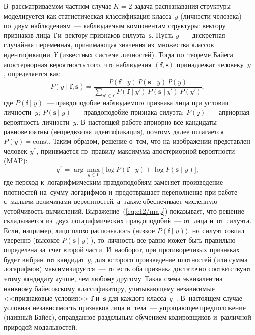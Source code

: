 В~рассматриваемом частном случае $K=2$ задача распознавания структуры
моделируется как статистическая классификация
класса~$y$ (личности человека) по~двум наблюдениям~--- наблюдаемым
компонентам структуры: вектору признаков лица~$\mathbf{f}$
и~вектору признаков силуэта~$\mathbf{s}$. Пусть $y$~--- дискретная
случайная переменная, принимающая значения из~множества классов
идентификации~$Y$ (известных системе личностей). Тогда по~теореме
Байеса апостериорная вероятность того, что наблюдения
$(\mathbf{f},\mathbf{s})$ принадлежат человеку~$y$, определяется как:
\begin{equation}\label{eq:ch2/bayes}
    P(y\mid\mathbf{f},\mathbf{s})=\frac{P(\mathbf{f}\mid y)\,P(\mathbf{s}\mid y)\,P(y)}{\sum\limits_{y'\in Y}P(\mathbf{f}\mid y')\,P(\mathbf{s}\mid y')\,P(y')},
\end{equation}
где $P(\mathbf{f}\mid y)$~--- правдоподобие наблюдаемого признака лица
при условии личности~$y$; $P(\mathbf{s}\mid y)$~--- правдоподобие
признака силуэта; $P(y)$~--- априорная вероятность личности~$y$.
В~настоящей работе априорно все кандидаты равновероятны
(непредвзятая идентификация), поэтому далее полагается
$P(y)=\mathrm{const}$. Таким образом, решение о~том, что
на~изображении представлен человек~$y^*$, принимается по~правилу
максимума апостериорной вероятности (MAP):
\begin{equation}\label{eq:ch2/map}
    y^*=\arg\max_{y\in Y}\bigl[\log P(\mathbf{f}\mid y)+\log P(\mathbf{s}\mid y)\bigr],
\end{equation}
где переход к~логарифмическим правдоподобиям заменяет произведение
плотностей на~сумму логарифмов и~предотвращает переполнение при работе
с~малыми величинами вероятностей, а~также обеспечивает численную
устойчивость вычислений. Выражение~(\ref{eq:ch2/map}) показывает, что
решение складывается из~двух логарифмических правдоподобий~---
от~лица и~от~силуэта. Если, например, лицо плохо распозналось (низкое
$P(\mathbf{f}\mid y)$), но~силуэт совпал уверенно (высокое
$P(\mathbf{s}\mid y)$), то~личность все равно может быть правильно
определена за~счет второй части. И~наоборот, при противоречивых
признаках будет выбран тот кандидат~$y$, для которого произведение
плотностей (или сумма логарифмов) максимизируется~--- то~есть оба
признака достаточно соответствуют этому кандидату лучше, чем любому
другому. Такая схема эквивалентна наивному байесовскому
классификатору, учитывающему независимые <<признаковые условия>>
$\mathbf{f}$ и~$\mathbf{s}$ для каждого класса~$y$~\cite{Koo2018multimodal}.
В~настоящем случае условная независимость признаков лица и~тела~---
упрощающее предположение (наивный Байес), оправданное раздельным
обучением кодировщиков и~различной природой модальностей.

